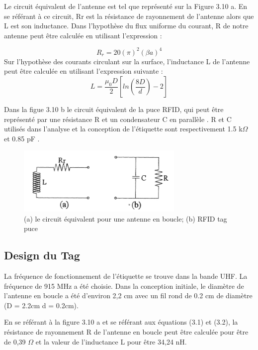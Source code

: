\documentclass[11pt, a4paper, twoside]{book}
\begin{document}
Le circuit équivalent de l'antenne est tel que représenté sur la Figure 3.10 a. En se référant à ce circuit, Rr est la résistance de rayonnement de l'antenne alors que L est son inductance. Dans l'hypothèse du flux uniforme du courant, R de notre antenne  peut être calculée en utilisant l'expression \cite{antennatheory}:

\begin{equation}
R_{r}  = 20 (\pi)^{2}(\beta a)^{4}
\end{equation}
Sur l'hypothèse des courants circulant sur la surface, l'inductance L de l'antenne peut être calculée en utilisant l'expression suivante \cite{antennatheory}:
\begin{equation}
L  = \frac{\mu_{0}D}{2}[ln(\frac{8D}{d})-2]
\end{equation}

Dans la figue 3.10 b le circuit équivalent de la puce RFID, qui peut être représenté par une résistance R et un condensateur  C en parallèle . R et C utilisés dans l'analyse et la conception de l'étiquette sont respectivement 1.5 k\(\Omega\) et 0.85 pF .

\begin{figure}[H]
\centering
\includegraphics[width=8cm]{eq}
\caption{(a) le circuit équivalent pour une antenne en boucle; (b) RFID tag puce}
\end{figure}

\subsection{Design du Tag}
La fréquence de fonctionnement de l'étiquette se trouve dans la bande UHF.
La fréquence de 915 MHz a été choisie. Dans la conception initiale, le diamètre de l'antenne en boucle a été d'environ 2,2 cm avec un fil rond de 0.2 cm de diamètre  (D = 2.2cm d = 0.2cm).

En se référant à la figure 3.10 a et se référant aux équations (3.1) et (3.2), la résistance de rayonnement R de l'antenne en boucle peut être calculée pour être de 0,39  \(\Omega\) et la valeur de l'inductance L pour être  34,24 nH.\\
\end{document}
